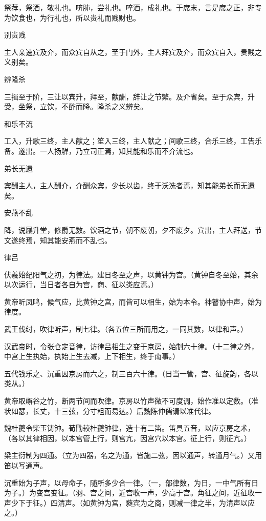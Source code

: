 \documentclass[a4paper,12pt,UTF8,twoside]{ctexbook}
\begin{document}
    祭荐，祭酒，敬礼也。哜肺，尝礼也。啐酒，成礼也。于席末，言是席之正，非专为饮食也，为行礼也，所以贵礼而贱财也。
    
    别贵贱
    
    主人亲速宾及介，而众宾自从之，至于门外，主人拜宾及介，而众宾自入，贵贱之义别矣。
    
    辨隆杀
    
    三揖至于阶，三让以宾升，拜至，献酬，辞让之节繁。及介省矣。至于众宾，升受，坐祭，立饮，不酢而降。隆杀之义辨矣。
    
    和乐不流
    
    工入，升歌三终，主人献之；笙入三终，主人献之；间歌三终，合乐三终，工告乐备。遂出。一人扬觯，乃立司正焉，知其能和乐而不介流也。
    
    弟长无遗
    
    宾酬主人，主人酬介，介酬众宾，少长以齿，终于沃洗者焉，知其能弟长而无遗矣。
    
    安燕不乱
    
    降，说屦升堂，修爵无数。饮酒之节，朝不废朝，夕不废夕。宾出，主人拜送，节文遂终焉，知其能安燕而不乱也。
    
    律吕
    
    伏羲始纪阳气之初，为律法。建日冬至之声，以黄钟为宫。（黄钟自冬至始，其余以次运行，当日者各自为宫，商、征以类应焉。）
    
    黄帝听凤鸣，候气应，比黄钟之宫，而皆可以相生，始为本令。神瞽协中声，始为律度。
    
    武王伐纣，吹律听声，制七律。（各五位三所而用之，一同其数，以律和声。）
    
    汉武帝时，令张仓定音律，访律吕相生之变于京房，始制六十律。（十二律之外，中宫上生执始，执始上生去减，上下相生，终于南事。）
    
    五代钱乐之、沉重因京房而六之，制三百六十律。（日当一管，宫、征旋韵，各以类从。）
    
    黄帝取嶰谷之竹，断两节间而吹律。京房以竹声微不可度调，始作准以定数。（准状如瑟，长丈，十三弦，分寸粗而易达。）后魏陈仲儒请以准代律。
    
    魏杜夔令柴玉铸钟。荀勖较杜夔钟律，造十有二笛。笛具五音，以应京房之术，（各以其律相因，以本宫管上行，则宫亢，因宫穴以本宫。征上行，则征亢。）
    
    梁主衍制为四通。（立为四器，名之为通，皆施二弦，因以通声，转通月气。）又用笛以写通声。
    
    沉重始为子声，以母命子，随所多少合一律。（一，部律数，为日，一中气所有日为子。）为变宫变征。（羽、宫之间，近宫收一声，少高于宫。角征之间，近征收一声少下于征。）四清声。（如黄钟为宫，蕤宾为之商，则减一律之半，为清声以应之。）
    
\end{document}
